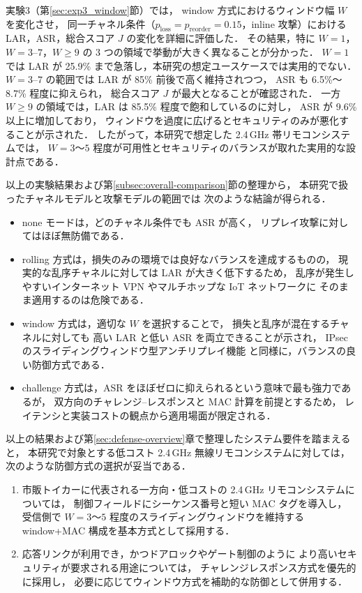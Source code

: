 \documentclass[twocolumn,10pt,a4paper]{jsarticle}
\begin{document}
実験3（第\ref{sec:exp3_window}節）では，
window 方式におけるウィンドウ幅 $W$ を変化させ，
同一チャネル条件（$p_{\mathrm{loss}} = p_{\mathrm{reorder}} = 0.15$，inline 攻撃）における
LAR，ASR，総合スコア $J$ の変化を詳細に評価した．
その結果，特に $W=1$，$W=3$--$7$，$W \ge 9$ の
3 つの領域で挙動が大きく異なることが分かった．
$W=1$ では LAR が 25.9\% まで急落し，本研究の想定ユースケースでは実用的でない．
$W=3$--$7$ の範囲では LAR が 85\% 前後で高く維持されつつ，
ASR も 6.5\%～8.7\% 程度に抑えられ，
総合スコア $J$ が最大となることが確認された．
一方 $W \ge 9$ の領域では，LAR は 85.5\% 程度で飽和しているのに対し，
ASR が 9.6\% 以上に増加しており，
ウィンドウを過度に広げるとセキュリティのみが悪化することが示された．
したがって，本研究で想定した 2.4\,GHz 帯リモコンシステムでは，
$W=3$～$5$ 程度が可用性とセキュリティのバランスが取れた実用的な設計点である．

以上の実験結果および第\ref{subsec:overall-comparison}節の整理から，
本研究で扱ったチャネルモデルと攻撃モデルの範囲では
次のような結論が得られる．
\begin{itemize}
  \item none モードは，どのチャネル条件でも ASR が高く，
        リプレイ攻撃に対してはほぼ無防備である．
  \item rolling 方式は，損失のみの環境では良好なバランスを達成するものの，
        現実的な乱序チャネルに対しては LAR が大きく低下するため，
        乱序が発生しやすいインターネット VPN やマルチホップな IoT ネットワークに
        そのまま適用するのは危険である．
  \item window 方式は，適切な $W$ を選択することで，
        損失と乱序が混在するチャネルに対しても
        高い LAR と低い ASR を両立できることが示され，
        IPsec のスライディングウィンドウ型アンチリプレイ機能\cite{rfc4303,rfc6479}
        と同様に，バランスの良い防御方式である．
  \item challenge 方式は，ASR をほぼゼロに抑えられるという意味で最も強力であるが，
        双方向のチャレンジ--レスポンスと MAC 計算を前提とするため，
        レイテンシと実装コストの観点から適用場面が限定される．
\end{itemize}

以上の結果および第\ref{sec:defense-overview}章で整理したシステム要件を踏まえると，
本研究で対象とする低コスト 2.4\,GHz 無線リモコンシステムに対しては，
次のような防御方式の選択が妥当である．

\begin{enumerate}
  \item 市販トイカーに代表される一方向・低コストの 2.4\,GHz リモコンシステムについては，
        制御フィールドにシーケンス番号と短い MAC タグを導入し，
        受信側で $W=3$～$5$ 程度のスライディングウィンドウを維持する
        window+MAC 構成を基本方式として採用する．
  \item 応答リンクが利用でき，かつドアロックやゲート制御のように
        より高いセキュリティが要求される用途については，
        チャレンジレスポンス方式を優先的に採用し，
        必要に応じてウィンドウ方式を補助的な防御として併用する．
\end{enumerate}
\end{document}
